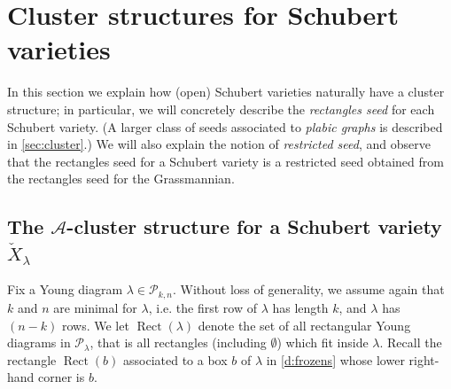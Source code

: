 \documentclass{amsart}
\theoremstyle{definition}
\newtheorem{remark}[thm]{Remark}
\numberwithin{equation}{section}
\newcommand{\pathne}[1]{L^\nearrow_{#1}} %
\newcommand{\pathsw}[1]{L^\swarrow_{#1}}
\newcommand{\vertne}[1]{V^\nearrow(#1)} %
\newcommand{\partne}[1]{\lambda^\nearrow(#1)} %
\newcommand{\Shkn}{{\mathcal P_{k,n}}}
\def\Rect{\operatorname{Rect}}
\newcommand{\A}{\mathcal{A}}
\newcommand{\dualSchub}{\check{X}_{\lambda}}
\begin{document}

\section{Cluster structures for Schubert varieties}\label{sec:A}

In this section we explain how (open) Schubert varieties naturally 
have a cluster structure; in particular, we will concretely describe the 
\emph{rectangles seed} for each Schubert variety.  (A larger class of seeds associated to 
\emph{plabic graphs} is described in 
\cref{sec:cluster}.)
We will also explain the notion of \emph{restricted seed},
and observe that the rectangles seed for a Schubert variety
is a restricted seed obtained from the rectangles seed for the Grassmannian.

\subsection{The $\A$-cluster structure for a Schubert variety $\dualSchub$}
\label{sec:Acluster}
Fix a Young diagram $\lambda\in \Shkn$.
 Without loss of generality,
we assume again that $k$ and $n$ are minimal for $\lambda$, i.e. the first row of $\lambda$ has length $k$, and $\lambda$ has $(n-k)$ rows.
We let $\Rect(\lambda)$ denote the set of all rectangular Young diagrams in $\mathcal P_\lambda$, that is all rectangles (including $\emptyset$) which fit inside 
$\lambda$.  Recall the rectangle
  $\Rect(b)$ associated to a box $b$ of $\lambda$ in \cref{d:frozens} whose lower right-hand corner is $b$.
\end{document}
